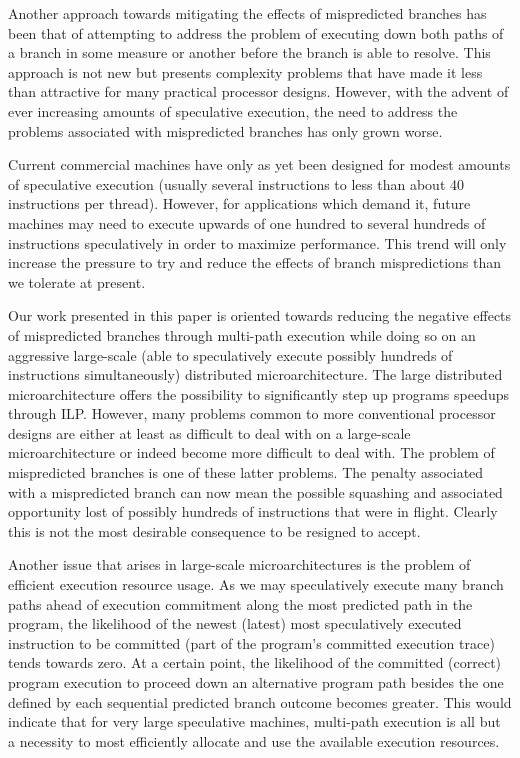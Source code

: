 \documentclass[10pt,dvips]{article}
\begin{document}
Another approach towards mitigating the effects of mispredicted branches
has been that of attempting to address the problem of executing
down both paths of a branch in some measure or another before the
branch is able to resolve.  This approach is not new but presents
complexity problems that have made it less than attractive for
many practical processor designs.  However, with the advent of ever
increasing amounts of speculative execution, the need to address
the problems associated with mispredicted branches has only grown worse.

Current commercial machines have only as yet been designed for modest
amounts of speculative execution (usually several instructions to 
less than about 40 instructions per thread).
However, for applications which demand it,
future machines may need to execute upwards of one hundred to
several hundreds of instructions speculatively in order to maximize
performance.  This trend will only increase the pressure to try
and reduce the effects of branch mispredictions than we tolerate
at present.

Our work presented in this paper is oriented towards reducing the
negative effects of mispredicted branches through multi-path execution
while doing so on an aggressive large-scale (able to speculatively execute
possibly hundreds of instructions simultaneously)
distributed
microarchitecture.  The large distributed microarchitecture offers the
possibility to significantly step up programs speedups through ILP.
However, many problems common to more conventional processor designs
are either at least as difficult to deal with on a large-scale
microarchitecture or indeed become more difficult to deal with.
The problem of mispredicted branches is one of these latter problems.
The penalty associated with a mispredicted branch can now mean
the possible squashing and associated opportunity lost of possibly
hundreds of instructions that were in flight.  Clearly this
is not the most desirable consequence to be resigned to accept.

Another issue that arises in large-scale microarchitectures is the
problem of efficient execution resource usage.
As we may speculatively execute many branch paths ahead of execution
commitment along the most predicted path in the program, the likelihood
of the newest (latest) most speculatively executed instruction to
be committed (part of the program's committed execution trace) tends
towards zero.  At a certain point, the likelihood of the committed (correct)
program execution to proceed down an alternative program path
besides the one defined by each sequential predicted branch outcome
becomes greater.  This would indicate that for very large speculative
machines, multi-path execution is all but a necessity to most
efficiently allocate and use the available execution resources.
\end{document}
